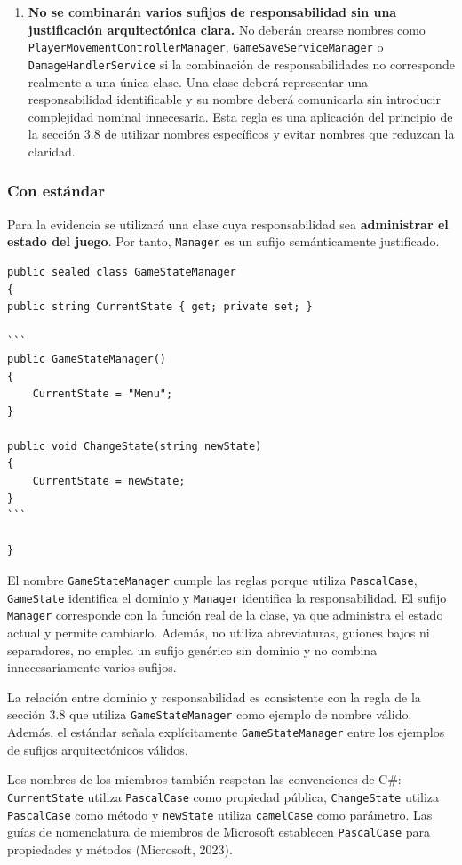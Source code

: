 \begin{enumerate}
\item \textbf{No se combinarán varios sufijos de responsabilidad sin una justificación arquitectónica clara.} No deberán crearse nombres como \texttt{PlayerMovementControllerManager}, \texttt{GameSaveServiceManager} o \texttt{DamageHandlerService} si la combinación de responsabilidades no corresponde realmente a una única clase. Una clase deberá representar una responsabilidad identificable y su nombre deberá comunicarla sin introducir complejidad nominal innecesaria. Esta regla es una aplicación del principio de la sección 3.8 de utilizar nombres específicos y evitar nombres que reduzcan la claridad.

\end{enumerate}

\subsubsection{Con estándar}

Para la evidencia se utilizará una clase cuya responsabilidad sea \textbf{administrar el estado del juego}. Por tanto, \texttt{Manager} es un sufijo semánticamente justificado.

\begin{lstlisting}[style=csharpstyle]
public sealed class GameStateManager
{
public string CurrentState { get; private set; }

```
public GameStateManager()
{
    CurrentState = "Menu";
}

public void ChangeState(string newState)
{
    CurrentState = newState;
}
```

}
\end{lstlisting}

El nombre \texttt{GameStateManager} cumple las reglas porque utiliza \texttt{PascalCase}, \texttt{GameState} identifica el dominio y \texttt{Manager} identifica la responsabilidad. El sufijo \texttt{Manager} corresponde con la función real de la clase, ya que administra el estado actual y permite cambiarlo. Además, no utiliza abreviaturas, guiones bajos ni separadores, no emplea un sufijo genérico sin dominio y no combina innecesariamente varios sufijos.

La relación entre dominio y responsabilidad es consistente con la regla de la sección 3.8 que utiliza \texttt{GameStateManager} como ejemplo de nombre válido. Además, el estándar señala explícitamente \texttt{GameStateManager} entre los ejemplos de sufijos arquitectónicos válidos.

Los nombres de los miembros también respetan las convenciones de C\#: \texttt{CurrentState} utiliza \texttt{PascalCase} como propiedad pública, \texttt{ChangeState} utiliza \texttt{PascalCase} como método y \texttt{newState} utiliza \texttt{camelCase} como parámetro. Las guías de nomenclatura de miembros de Microsoft establecen \texttt{PascalCase} para propiedades y métodos (Microsoft, 2023).

